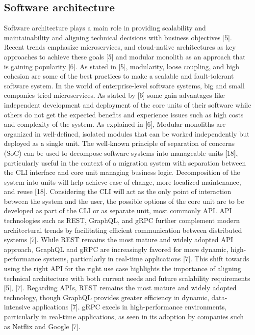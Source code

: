 \documentclass{article}
\begin{document}
\begin{multicols}{2}
\subsection{Software architecture}
Software architecture plays a main role in providing scalability and maintainability and aligning technical decisions with business objectives [5]. Recent trends emphasize microservices, and cloud-native architectures as key approaches to achieve these goals [5] and modular monolith as an approach that is gaining popularity [6]. As stated in [5], modularity, loose coupling, and high cohesion are some of the best practices to make a scalable and fault-tolerant software system. In the world of enterprise-level software systems, big and small companies tried microservices. As stated by [6] some gain advantages like independent development and deployment of the core units of their software while others do not get the expected benefits and experience issues such as high costs and complexity of the system. As explained in [6], Modular monoliths are organized in well-defined, isolated modules that can be worked independently but deployed as a single unit. The well-known principle of separation of concerns (SoC) can be used to decompose software systems into manageable units [18], particularly useful in the context of a migration system with separation between the CLI interface and core unit managing business logic. Decomposition of the system into units will help achieve ease of change, more localized maintenance, and reuse [18]. Considering the CLI will act as the only point of interaction between the system and the user, the possible options of the core unit are to be developed as part of the CLI or as separate unit, most commonly API. API technologies such as REST, GraphQL, and gRPC further complement modern architectural trends by facilitating efficient communication between distributed systems [7]. While REST remains the most mature and widely adopted API approach, GraphQL and gRPC are increasingly favored for more dynamic, high-performance systems, particularly in real-time applications [7]. This shift towards using the right API for the right use case highlights the importance of aligning technical architecture with both current needs and future scalability requirements [5], [7]. Regarding APIs, REST remains the most mature and widely adopted technology, though GraphQL provides greater efficiency in dynamic, data-intensive applications [7]. gRPC excels in high-performance environments, particularly in real-time applications, as seen in its adoption by companies such as Netflix and Google [7].


\end{multicols}
\end{document}
